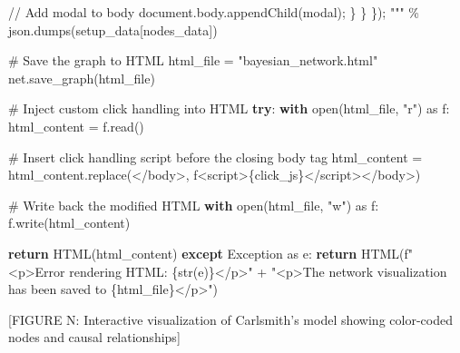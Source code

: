 \documentclass[
  11pt,
  letterpaper,
]{book}
\newenvironment{Shaded}{\begin{snugshade}}{\end{snugshade}}
\newcommand{\BuiltInTok}[1]{\textcolor[rgb]{0.00,0.23,0.31}{#1}}
\newcommand{\CommentTok}[1]{\textcolor[rgb]{0.37,0.37,0.37}{#1}}
\newcommand{\ControlFlowTok}[1]{\textcolor[rgb]{0.00,0.23,0.31}{\textbf{#1}}}
\newcommand{\ImportTok}[1]{\textcolor[rgb]{0.00,0.46,0.62}{#1}}
\newcommand{\NormalTok}[1]{\textcolor[rgb]{0.00,0.23,0.31}{#1}}
\newcommand{\OperatorTok}[1]{\textcolor[rgb]{0.37,0.37,0.37}{#1}}
\newcommand{\PreprocessorTok}[1]{\textcolor[rgb]{0.68,0.00,0.00}{#1}}
\newcommand{\SpecialCharTok}[1]{\textcolor[rgb]{0.37,0.37,0.37}{#1}}
\newcommand{\SpecialStringTok}[1]{\textcolor[rgb]{0.13,0.47,0.30}{#1}}
\newcommand{\StringTok}[1]{\textcolor[rgb]{0.13,0.47,0.30}{#1}}
\begin{document}
\begin{landscape}
\begin{Shaded}
\begin{Highlighting}[]
\StringTok{                // Add modal to body}
\StringTok{                document.body.appendChild(modal);}
\StringTok{            \}}
\StringTok{        \}}
\StringTok{    \});}
\StringTok{    """} \OperatorTok{\%}\NormalTok{ json.dumps(setup\_data[}\StringTok{\textquotesingle{}nodes\_data\textquotesingle{}}\NormalTok{])}

    \CommentTok{\# Save the graph to HTML}
\NormalTok{    html\_file }\OperatorTok{=} \StringTok{"bayesian\_network.html"}
\NormalTok{    net.save\_graph(html\_file)}

    \CommentTok{\# Inject custom click handling into HTML}
    \ControlFlowTok{try}\NormalTok{:}
        \ControlFlowTok{with} \BuiltInTok{open}\NormalTok{(html\_file, }\StringTok{"r"}\NormalTok{) }\ImportTok{as}\NormalTok{ f:}
\NormalTok{            html\_content }\OperatorTok{=}\NormalTok{ f.read()}

        \CommentTok{\# Insert click handling script before the closing body tag}
\NormalTok{        html\_content }\OperatorTok{=}\NormalTok{ html\_content.replace(}\StringTok{\textquotesingle{}\textless{}/body\textgreater{}\textquotesingle{}}\NormalTok{, }\SpecialStringTok{f\textquotesingle{}\textless{}script\textgreater{}}\SpecialCharTok{\{}\NormalTok{click\_js}\SpecialCharTok{\}}\SpecialStringTok{\textless{}/script\textgreater{}\textless{}/body\textgreater{}\textquotesingle{}}\NormalTok{)}

        \CommentTok{\# Write back the modified HTML}
        \ControlFlowTok{with} \BuiltInTok{open}\NormalTok{(html\_file, }\StringTok{"w"}\NormalTok{) }\ImportTok{as}\NormalTok{ f:}
\NormalTok{            f.write(html\_content)}

        \ControlFlowTok{return}\NormalTok{ HTML(html\_content)}
    \ControlFlowTok{except} \PreprocessorTok{Exception} \ImportTok{as}\NormalTok{ e:}
        \ControlFlowTok{return}\NormalTok{ HTML(}\SpecialStringTok{f"\textless{}p\textgreater{}Error rendering HTML: }\SpecialCharTok{\{}\BuiltInTok{str}\NormalTok{(e)}\SpecialCharTok{\}}\SpecialStringTok{\textless{}/p\textgreater{}"}
        \OperatorTok{+} \StringTok{"\textless{}p\textgreater{}The network visualization has been saved to \textquotesingle{}}\SpecialCharTok{\{html\_file\}}\StringTok{\textquotesingle{}\textless{}/p\textgreater{}"}\NormalTok{)}
\end{Highlighting}
\end{Shaded}

{[}FIGURE N: Interactive visualization of Carlsmith's model showing
color-coded nodes and causal relationships{]}


\end{landscape}
\end{document}
